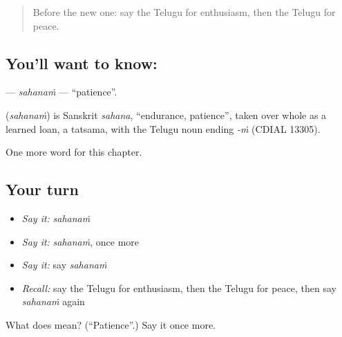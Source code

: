 \label{lesson:TE-C168-sahanam}



\begin{quote}
Before the new one: say the Telugu for enthusiasm, then the Telugu for peace.
\end{quote}

\subsection*{You'll want to know: }
\textbf{} — \emph{sahanaṁ} — \textquotedblleft{}patience\textquotedblright{}.

\begin{cousinweb}
\textbf{} (\emph{sahanaṁ}) is Sanskrit \emph{sahana}, \textquotedblleft{}endurance, patience\textquotedblright{}, taken over whole as a learned loan, a tatsama, with the Telugu noun ending \emph{-ṁ} (CDIAL 13305).
\end{cousinweb}

\begin{grammarlens}[title={What you've built}]
One more word for this chapter.
\end{grammarlens}

\subsection*{Your turn}
\begin{itemize}
\raggedright
  \item \emph{Say it:} \emph{sahanaṁ}
  \item \emph{Say it:} \emph{sahanaṁ}, once more
  \item \emph{Say it:} say \emph{sahanaṁ}
  \item \emph{Recall:} say the Telugu for enthusiasm, then the Telugu for peace, then say \emph{sahanaṁ} again
\end{itemize}

\begin{tcolorbox}[breakable,colback=teal!4,colframe=teal!35!black,title={Before you move on}]
What does  mean? (\textquotedblleft{}Patience\textquotedblright{}.) Say it once more.
\end{tcolorbox}
